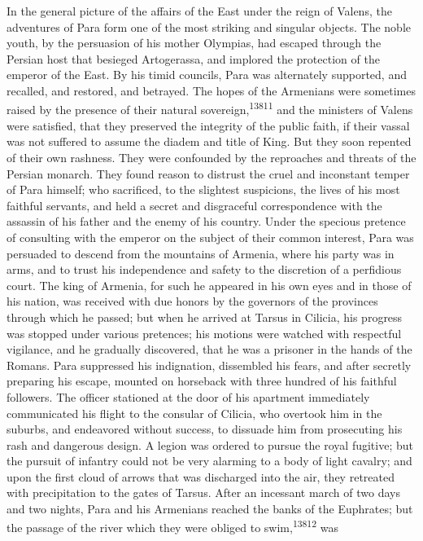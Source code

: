 {{{{{{{{{{{{{{{{{{{{{{{{{{{{{{{{{{{{{{{{{{{{{{{{{{{{{{{{{{{{{{{{{{{{{{{{{{{{{{{{{{{{{{{{{{{{{{{{{{{{{{{{{{{{{{{{{{{{{{{{{{{{{{{{{{{{{{{{{{{{{{{{{{{{{{{{{{In the general picture of the affairs of the East under the reign
of Valens, the adventures of Para form one of the most striking
and singular objects. The noble youth, by the persuasion of his
mother Olympias, had escaped through the Persian host that
besieged Artogerassa, and implored the protection of the emperor
of the East. By his timid councils, Para was alternately
supported, and recalled, and restored, and betrayed. The hopes of
the Armenians were sometimes raised by the presence of their
natural sovereign,\textsuperscript{13811} and the ministers of Valens were
satisfied, that they preserved the integrity of the public faith,
if their vassal was not suffered to assume the diadem and title
of King. But they soon repented of their own rashness. They were
confounded by the reproaches and threats of the Persian monarch.
They found reason to distrust the cruel and inconstant temper of
Para himself; who sacrificed, to the slightest suspicions, the
lives of his most faithful servants, and held a secret and
disgraceful correspondence with the assassin of his father and
the enemy of his country. Under the specious pretence of
consulting with the emperor on the subject of their common
interest, Para was persuaded to descend from the mountains of
Armenia, where his party was in arms, and to trust his
independence and safety to the discretion of a perfidious court.
The king of Armenia, for such he appeared in his own eyes and in
those of his nation, was received with due honors by the
governors of the provinces through which he passed; but when he
arrived at Tarsus in Cilicia, his progress was stopped under
various pretences; his motions were watched with respectful
vigilance, and he gradually discovered, that he was a prisoner in
the hands of the Romans. Para suppressed his indignation,
dissembled his fears, and after secretly preparing his escape,
mounted on horseback with three hundred of his faithful
followers. The officer stationed at the door of his apartment
immediately communicated his flight to the consular of Cilicia,
who overtook him in the suburbs, and endeavored without success,
to dissuade him from prosecuting his rash and dangerous design. A
legion was ordered to pursue the royal fugitive; but the pursuit
of infantry could not be very alarming to a body of light
cavalry; and upon the first cloud of arrows that was discharged
into the air, they retreated with precipitation to the gates of
Tarsus. After an incessant march of two days and two nights, Para
and his Armenians reached the banks of the Euphrates; but the
passage of the river which they were obliged to swim,\textsuperscript{13812} was
}}}}}}}}}}}}}}}}}}}}}}}}}}}}}}}}}}}}}}}}}}}}}}}}}}}}}}}}}}}}}}}}}}}}}}}}}}}}}}}}}}}}}}}}}}}}}}}}}}}}}}}}}}}}}}}}}}}}}}}}}}}}}}}}}}}}}}}}}}}}}}}}}}}}}}}}}}
